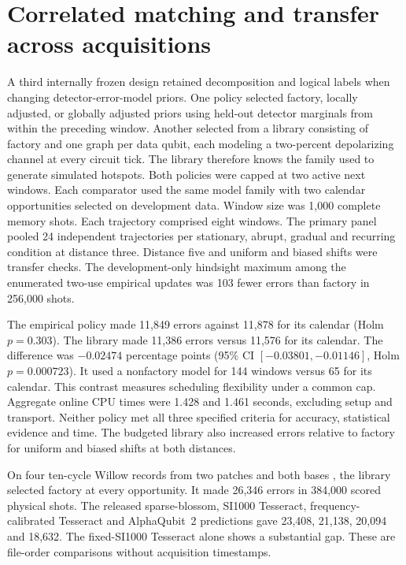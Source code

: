 \documentclass[10pt]{article}
\begin{document}
\section{Correlated matching and transfer across acquisitions}
A third internally frozen design retained decomposition and logical labels when changing detector-error-model priors. One policy selected factory, locally adjusted, or globally adjusted priors using held-out detector marginals from within the preceding window. Another selected from a library consisting of factory and one graph per data qubit, each modeling a two-percent depolarizing channel at every circuit tick. The library therefore knows the family used to generate simulated hotspots. Both policies were capped at two active next windows. Each comparator used the same model family with two calendar opportunities selected on development data. Window size was 1,000 complete memory shots. Each trajectory comprised eight windows. The primary panel pooled 24 independent trajectories per stationary, abrupt, gradual and recurring condition at distance three. Distance five and uniform and biased shifts were transfer checks. The development-only hindsight maximum among the enumerated two-use empirical updates was 103 fewer errors than factory in 256,000 shots.

The empirical policy made 11,849 errors against 11,878 for its calendar (Holm $p=0.303$). The library made 11,386 errors versus 11,576 for its calendar. The difference was $-0.02474$ percentage points (95\% CI $[-0.03801,-0.01146]$, Holm $p=0.000723$). It used a nonfactory model for 144 windows versus 65 for its calendar. This contrast measures scheduling flexibility under a common cap. Aggregate online CPU times were 1.428 and 1.461 seconds, excluding setup and transport. Neither policy met all three specified criteria for accuracy, statistical evidence and time. The budgeted library also increased errors relative to factory for uniform and biased shifts at both distances.

On four ten-cycle Willow records from two patches and both bases \cite{willowdata}, the library selected factory at every opportunity. It made 26,346 errors in 384,000 scored physical shots. The released sparse-blossom, SI1000 Tesseract, frequency-calibrated Tesseract and AlphaQubit~2 predictions gave 23,408, 21,138, 20,094 and 18,632. The fixed-SI1000 Tesseract alone shows a substantial gap. These are file-order comparisons without acquisition timestamps.
\end{document}
